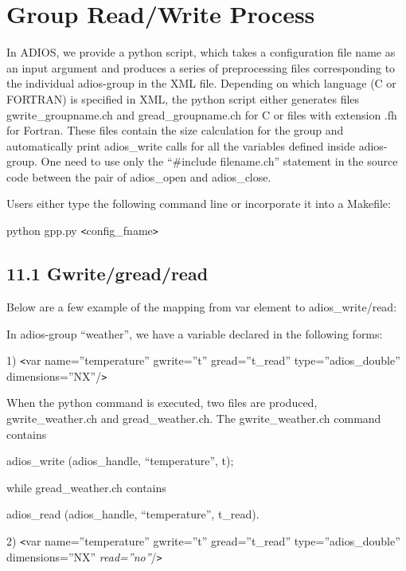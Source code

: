 \chapter{Group Read/Write Process}

In ADIOS, we provide a python script, which takes a configuration file name as 
an input argument and produces a series of preprocessing files corresponding to 
the individual adios-group in the XML file. Depending on which language (C or FORTRAN) 
is specified in XML, the python script either generates files gwrite\_groupname.ch 
and gread\_groupname.ch for C or files with extension .fh for Fortran. These files 
contain the size calculation for the group and automatically print adios\_write 
calls for all the variables defined inside adios-group. One need to use only the 
``\#include filename.ch'' statement in the source code between the pair of adios\_open 
and adios\_close.

Users either type the following command line or incorporate it into a Makefile:

python gpp.py \texttt{<}config\_fname\texttt{>}\label{HToc84890287}\label{HToc212016663}\label{HToc212016905}\label{HToc182553436}

\section*{{\large 11.1 }{\large \textbf{Gwrite/gread/read}}}

Below are a few example of the mapping from var element to adios\_write/read:

In adios-group ``weather'', we have a variable declared in the following forms:

1) \texttt{<}var name=''temperature'' gwrite=''t'' gread=''t\_read'' type=''adios\_double'' 
dimensions=''NX''/\texttt{>}

When the python command is executed, two files are produced, gwrite\_weather.ch 
and gread\_weather.ch. The gwrite\_weather.ch command contains 

adios\_write (adios\_handle, ``temperature'', t);

while gread\_weather.ch contains

adios\_read (adios\_handle, ``temperature'', t\_read).

2) \texttt{<}var name=''temperature'' gwrite=''t'' gread=''t\_read'' type=''adios\_double'' 
dimensions=''NX'' \textit{read=''no''}/\texttt{>}

